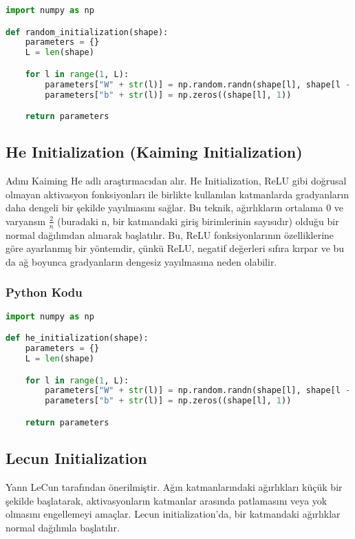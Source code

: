 \begin{lstlisting}[language=Python]
import numpy as np

def random_initialization(shape):
    parameters = {}
    L = len(shape)

    for l in range(1, L):
        parameters["W" + str(l)] = np.random.randn(shape[l], shape[l - 1]) * 10
        parameters["b" + str(l)] = np.zeros((shape[l], 1))

    return parameters
\end{lstlisting}

\newpage

\subsection{He Initialization (Kaiming Initialization)}
Adını Kaiming He adlı araştırmacıdan alır. He Initialization, ReLU gibi doğrusal olmayan aktivasyon fonksiyonları ile birlikte kullanılan katmanlarda gradyanların daha dengeli bir şekilde yayılmasını sağlar. Bu teknik, ağırlıkların ortalama 0 ve varyansın $\frac{2}{n}$ (buradaki n, bir katmandaki giriş birimlerinin sayısıdır) olduğu bir normal dağılımdan alınarak başlatılır. Bu, ReLU fonksiyonlarının özelliklerine göre ayarlanmış bir yöntemdir, çünkü ReLU, negatif değerleri sıfıra kırpar ve bu da ağ boyunca gradyanların dengesiz yayılmasına neden olabilir.

\subsubsection{Python Kodu}

\begin{lstlisting}[language=Python]
import numpy as np

def he_initialization(shape):
    parameters = {}
    L = len(shape)

    for l in range(1, L):
        parameters["W" + str(l)] = np.random.randn(shape[l], shape[l - 1]) * np.sqrt(2 / shape[l - 1])
        parameters["b" + str(l)] = np.zeros((shape[l], 1))

    return parameters
\end{lstlisting}

\newpage

\subsection{Lecun Initialization}

Yann LeCun tarafından önerilmiştir. Ağın katmanlarındaki ağırlıkları küçük bir şekilde başlatarak, aktivasyonların katmanlar arasında patlamasını veya yok olmasını engellemeyi amaçlar. Lecun initialization'da, bir katmandaki ağırlıklar normal dağılımla başlatılır.

